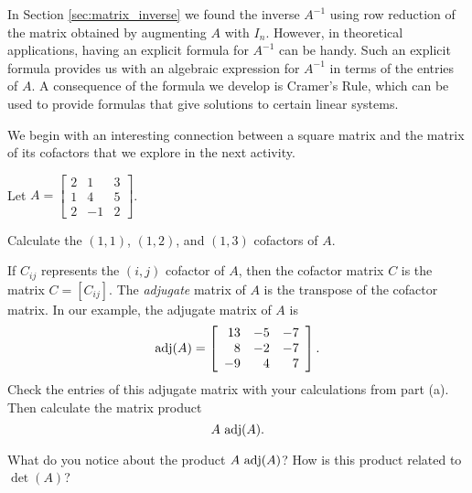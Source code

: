 \label{sec:inv_cramers}

In Section \ref{sec:matrix_inverse} we found the inverse $A^{-1}$ using row reduction of the matrix obtained by augmenting $A$ with $I_n$. However, in theoretical applications, having an explicit formula for $A^{-1}$ can be handy. Such an explicit formula provides us with an algebraic expression for $A^{-1}$ in terms of the entries of $A$. A consequence of the formula we develop is Cramer's Rule, which can be used to provide formulas that give solutions to certain linear systems.

We begin with an interesting connection between a square matrix and the matrix of its cofactors that we explore in the next activity.



\begin{activity} \label{act:4_f_4} Let $A = \left[ \begin{array}{crc} 2&1&3 \\ 1&4&5 \\ 2&-1&2 \end{array} \right]$. 
\ba
\item Calculate the $(1,1)$, $(1,2)$, and $(1,3)$ cofactors of $A$.



\item If $C_{ij}$ represents the $(i,j)$ cofactor of $A$, then the cofactor matrix $C$ is the matrix $C = [C_{ij}]$. The \emph{adjugate} matrix of $A$ is the transpose of the cofactor matrix. In our example, the adjugate matrix of $A$ is 
\[\text{adj}(A) = \left[ \begin{array}{rrr} 13&-5&-7 \\ 8&-2&-7 \\ -9&4&7 \end{array} \right].\]
Check the entries of this adjugate matrix with your calculations from part (a). Then calculate the matrix product
\[A \ \text{adj}(A).\]



\item What do you notice about the product $A \ \adj(A)$? How is this product related to $\det(A)$?



\ea

\end{activity}



